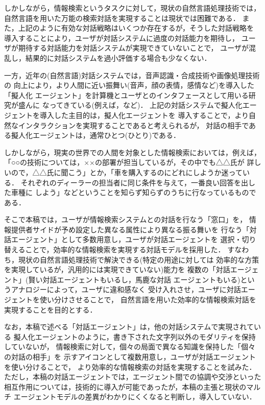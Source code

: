 しかしながら，情報検索というタスクに対して，現状の自然言語処理技術では，
自然言語を用いた万能の検索対話を実現することは現状では困難である．
また，上記のように有効な対話戦略はいくつか存在するが，そうした対話戦略を
導入することにより，ユーザが対話システムに過度の対話能力を期待し，
ユーザが期待する対話能力を対話システムが実現できていないことで，
ユーザが混乱し，結果的に対話システムを過小評価する場合も少なくない．
\bigskip

一方，近年の(自然言語)対話システムでは，音声認識・合成技術や画像処理技術の
向上により，より人間に近い振舞い(音声，顔の表情，感情など)を導入した「擬人化
エージェント」を計算機とユーザとのインタフェースとして用いる研究が盛んに
なってきている(例えば，\cite{tosburg,nagao,densouken,toyohasi}など)．
上記の対話システムで擬人化エージェントを導入した主目的は，擬人化エージェントを
導入することで，より自然なインタラクションを実現することであると考えられるが，
対話の相手である擬人化エージェントは，通常ひとつ(ひとり)である．

しかしながら，現実の世界での人間を対象とした情報検索においては，例えば，
「○○の技術については，××の部署が担当しているが，その中でも△△氏が
詳しいので，△△氏に聞こう」とか，「車を購入するのにどれにしようか迷っている．
それぞれのディーラーの担当者に同じ条件を与えて，一番良い回答を出した車種に
しよう」などということを知らず知らずのうちに行なっているものである．
\bigskip

そこで本稿では，ユーザが情報検索システムとの対話を行なう「窓口」を，
情報提供者サイドが予め設定した異なる属性により異なる振る舞いを
行なう「対話エージェント」として多数用意し，ユーザが対話エージェントを
選択・切り替えることで，効率的な情報検索を実現する対話モデルを採用した．
すなわち，現状の自然言語処理技術で解決できる(特定の用途に対しては
効率的な方策を実現しているが，汎用的には実現できていない)能力を
複数の「対話エージェント」(賢い対話エージェントもいるし，馬鹿な対話
エージェントもいる)というアナロジーによって，ユーザに違和感なく
受け入れさせ，ユーザに対話エージェントを使い分けさせることで，
自然言語を用いた効率的な情報検索対話を実現することを目的とする．

なお，本稿で述べる「対話エージェント」は，他の対話システムで実現されている
擬人化エージェントのように，書き下された文字列以外のモダリティを保持していないが，
情報検索に対して，個々の局面で異なる知識を保持した「個々の対話の相手」を
示すアイコンとして複数用意し，ユーザが対話エージェントを使い分けることで，
より効率的な情報検索の対話を実現することを試みた．
ただし，本稿の対話エージェントでは，エージェント間での協調や交渉といった
相互作用については，技術的に導入が可能であったが，本稿の主張と現状のマルチ
エージェントモデルの差異がわかりにくくなると判断し，導入していない．

